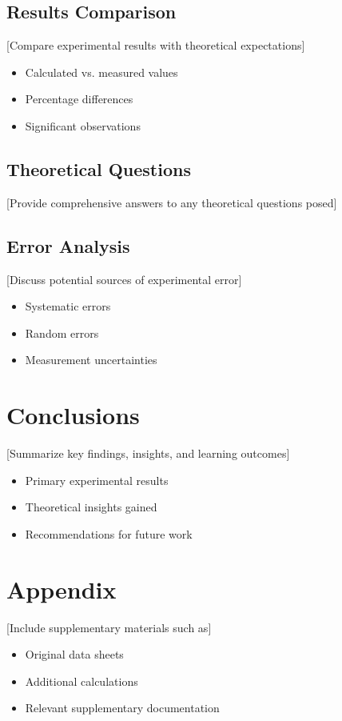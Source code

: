 \documentclass[a4paper]{article}
\begin{document}
\subsection{Results Comparison}
[Compare experimental results with theoretical expectations]
\begin{itemize}
    \item Calculated vs. measured values
    \item Percentage differences
    \item Significant observations
\end{itemize}

\subsection{Theoretical Questions}
[Provide comprehensive answers to any theoretical questions posed]

\subsection{Error Analysis}
[Discuss potential sources of experimental error]
\begin{itemize}
    \item Systematic errors
    \item Random errors
    \item Measurement uncertainties
\end{itemize}

\section{Conclusions}
[Summarize key findings, insights, and learning outcomes]
\begin{itemize}
    \item Primary experimental results
    \item Theoretical insights gained
    \item Recommendations for future work
\end{itemize}

\section*{Appendix}
[Include supplementary materials such as]
\begin{itemize}
    \item Original data sheets
    \item Additional calculations
    \item Relevant supplementary documentation
\end{itemize}
\end{document}
